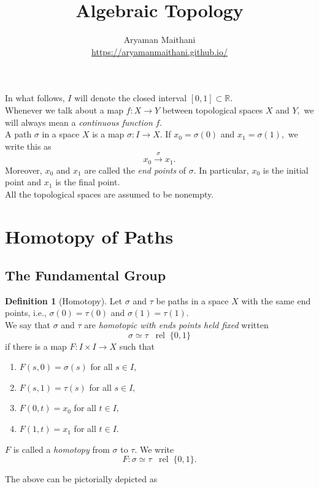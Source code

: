 \documentclass[12pt]{article}
\title{Algebraic Topology}
\author{Aryaman Maithani\\\url{https://aryamanmaithani.github.io/}}
\theoremstyle{definition}
\numberwithin{thm}{section}
\newtheorem{defn}[thm]{Definition}
\newcommand{\rel}{\;\;\operatorname{rel}\;}
\begin{document}
\maketitle

In what follows, $I$ will denote the closed interval $[0, 1] \subset \mathbb{R}.$\\
Whenever we talk about a map $f:X\to Y$ between topological spaces $X$ and $Y,$ we will always mean a \emph{continuous function} $f.$\\
A path $\sigma$ in a space $X$ is a map $\sigma: I \to X.$ If $x_0 = \sigma(0)$ and $x_1 = \sigma(1),$ we write this as
\begin{equation*} 
	x_0 \overset{\sigma}{\longrightarrow} x_1.
\end{equation*}
Moreover, $x_0$ and $x_1$ are called the \emph{end points} of $\sigma.$ In particular, $x_0$ is the initial point and $x_1$ is the final point.\\
All the topological spaces are assumed to be nonempty.
\section{Homotopy of Paths}
%
\subsection{The Fundamental Group}

\begin{defn}[Homotopy]
	Let $\sigma$ and $\tau$ be paths in a space $X$ with the same end points, i.e., $\sigma(0) = \tau(0)$ and $\sigma(1) = \tau(1).$\\
	We say that $\sigma$ and $\tau$ are \emph{homotopic with ends points held fixed} written
	\begin{equation*} 
		\sigma \simeq \tau \rel \{0, 1\}
	\end{equation*}
	if there is a map $F: I \times I \to X$ such that
	\begin{enumerate}
		\item $F(s, 0) = \sigma(s)$ for all $s \in I,$
		\item $F(s, 1) = \tau(s)$ for all $s \in I,$
		\item $F(0, t) = x_0$ for all $t \in I,$
		\item $F(1, t) = x_1$ for all $t \in I.$
	\end{enumerate}
	$F$ is called a \emph{homotopy} from $\sigma$ to $\tau.$ We write
	\begin{equation*} 
		F : \sigma \simeq \tau \rel \{0, 1\}.
	\end{equation*}
\end{defn}
The above can be pictorially depicted as
\end{document}
